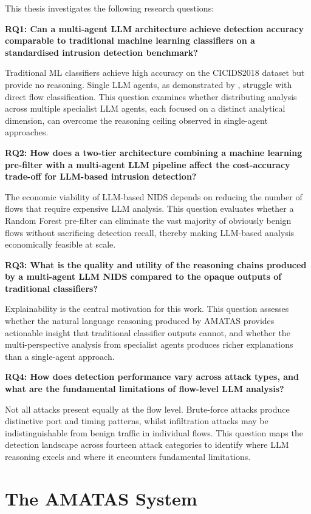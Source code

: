 This thesis investigates the following research questions:

\textbf{RQ1: Can a multi-agent LLM architecture achieve detection accuracy comparable to traditional machine learning classifiers on a standardised intrusion detection benchmark?}

Traditional ML classifiers achieve high accuracy on the CICIDS2018 dataset but provide no reasoning. Single LLM agents, as demonstrated by \textcite{Houssel2024}, struggle with direct flow classification. This question examines whether distributing analysis across multiple specialist LLM agents, each focused on a distinct analytical dimension, can overcome the reasoning ceiling observed in single-agent approaches.

\textbf{RQ2: How does a two-tier architecture combining a machine learning pre-filter with a multi-agent LLM pipeline affect the cost-accuracy trade-off for LLM-based intrusion detection?}

The economic viability of LLM-based NIDS depends on reducing the number of flows that require expensive LLM analysis. This question evaluates whether a Random Forest pre-filter can eliminate the vast majority of obviously benign flows without sacrificing detection recall, thereby making LLM-based analysis economically feasible at scale.

\textbf{RQ3: What is the quality and utility of the reasoning chains produced by a multi-agent LLM NIDS compared to the opaque outputs of traditional classifiers?}

Explainability is the central motivation for this work. This question assesses whether the natural language reasoning produced by AMATAS provides actionable insight that traditional classifier outputs cannot, and whether the multi-perspective analysis from specialist agents produces richer explanations than a single-agent approach.

\textbf{RQ4: How does detection performance vary across attack types, and what are the fundamental limitations of flow-level LLM analysis?}

Not all attacks present equally at the flow level. Brute-force attacks produce distinctive port and timing patterns, whilst infiltration attacks may be indistinguishable from benign traffic in individual flows. This question maps the detection landscape across fourteen attack categories to identify where LLM reasoning excels and where it encounters fundamental limitations.

\section{The AMATAS System}
\label{sec:amatas-system}


